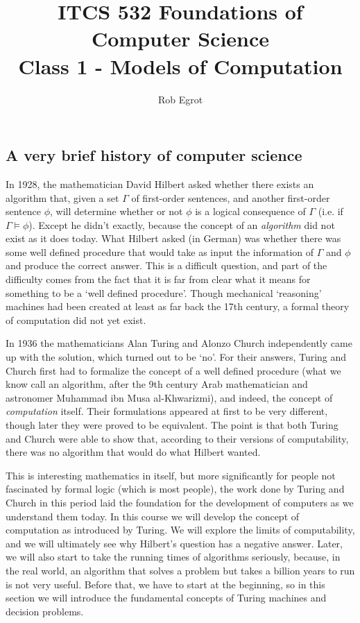 \documentclass{article}
\title{ITCS 532 Foundations of Computer Science\\
Class 1 - Models of Computation}
\author{Rob Egrot}
\date{}
\theoremstyle{plain}
\begin{document}
\maketitle
\subsection{A very brief history of computer science}
In 1928, the mathematician David Hilbert asked whether there exists an algorithm that, given a set $\Gamma$ of first-order sentences, and another first-order sentence $\phi$, will determine whether or not $\phi$ is a logical consequence of $\Gamma$ (i.e. if $\Gamma\models \phi$). Except he didn't exactly, because the concept of an \emph{algorithm} did not exist as it does today. What Hilbert asked (in German) was whether there was some well defined procedure that would take as input the information of $\Gamma$ and $\phi$ and produce the correct answer. This is a difficult question, and part of the difficulty comes from the fact that it is far from clear what it means for something to be a `well defined procedure'. Though mechanical `reasoning' machines had been created at least as far back the 17th century, a formal theory of computation did not yet exist.  

In 1936 the mathematicians Alan Turing and Alonzo Church independently came up with the solution, which turned out to be `no'. For their answers, Turing and Church first had to formalize the concept of a well defined procedure (what we know call an algorithm, after the 9th century Arab mathematician and astronomer Muhammad ibn Musa al-Khwarizmi), and indeed, the concept of \emph{computation} itself. Their formulations appeared at first to be very different, though later they were proved to be equivalent. The point is that both Turing and Church were able to show that, according to their versions of computability, there was no algorithm that would do what Hilbert wanted.

This is interesting mathematics in itself, but more significantly for people not fascinated by formal logic (which is most people), the work done by Turing and Church in this period laid the foundation for the development of computers as we understand them today. In this course we will develop the concept of computation as introduced by Turing. We will explore the limits of computability, and we will ultimately see why Hilbert's question has a negative answer. Later, we will also start to take the running times of algorithms seriously, because, in the real world, an algorithm that solves a problem but takes a billion years to run is not very useful. Before that, we have to start at the beginning, so in this section we will introduce the fundamental concepts of Turing machines and decision problems. 
\end{document}
